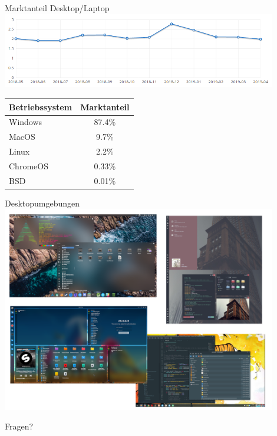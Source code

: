 \documentclass[10pt]{beamer}
\begin{document}
\begin{frame}{Marktanteil Desktop/Laptop}
\includegraphics[keepaspectratio, width=0.9\textwidth]{img/market_share.png}

\centering
\begin{table}
\begin{tabular}{l|c}
	\toprule
	\textbf{Betriebssystem} & \textbf{Marktanteil} \\
	\hline
	Windows & 87.4\% \\
	MacOS & 9.7\% \\
	Linux & 2.2\% \\
	ChromeOS & 0.33\% \\
	BSD & 0.01\% \\
	\bottomrule
\end{tabular}
\end{table}	
\end{frame}

\begin{frame}{Desktopumgebungen}
\centering
\includegraphics[keepaspectratio,width=0.9\textwidth]{img/desktops.png}
\end{frame}

\begin{frame}[standout]
Fragen?
\end{frame}
\end{document}
